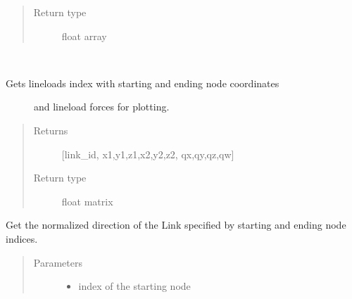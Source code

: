 \documentclass[letterpaper,10pt,english]{sphinxmanual}
\begin{document}
\begin{fulllineitems}
\begin{fulllineitems}
\begin{quote}
\begin{description}
\item[{Return type}] \leavevmode
float array

\end{description}\end{quote}

\end{fulllineitems}


\begin{fulllineitems}
\label{\detokenize{api:beamon.database.Database.get_lineloads_for_plotting}}~\begin{description}
\item[{Gets lineloads index with starting and ending node coordinates}] \leavevmode
and lineload forces for plotting.

\end{description}
\begin{quote}\begin{description}
\item[{Returns}] \leavevmode
{[}link\_id, x1,y1,z1,x2,y2,z2, qx,qy,qz,qw{]}

\item[{Return type}] \leavevmode
float matrix

\end{description}\end{quote}

\end{fulllineitems}


\begin{fulllineitems}
\label{\detokenize{api:beamon.database.Database.get_link_direction}}
Get the normalized direction of the Link specified by starting and ending node indices.
\begin{quote}\begin{description}
\item[{Parameters}] \leavevmode\begin{itemize}
\item {} 
 \textendash{} index of the starting node


\end{itemize}
\end{description}
\end{quote}
\end{fulllineitems}
\end{fulllineitems}
\end{document}
